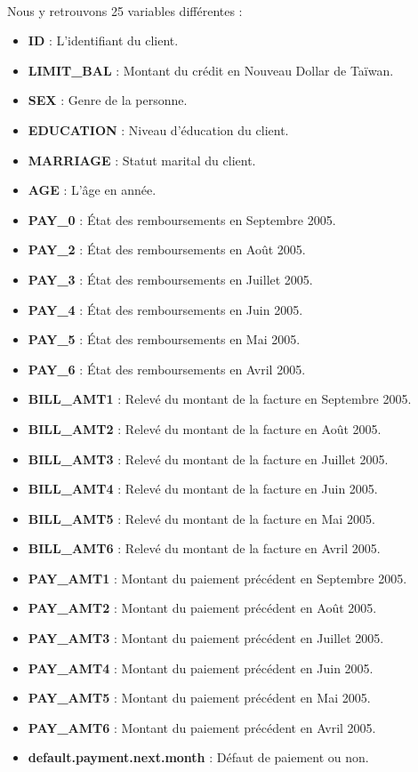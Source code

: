 \documentclass[10pt, french, a4paper]{report}
\begin{document}
\paragraph{}
Nous y retrouvons 25 variables différentes :

\begin{itemize}
  \item \textbf{ID} : L'identifiant du client. 
  \item \textbf{LIMIT\_BAL} : Montant du crédit en Nouveau Dollar de Taïwan.
  \item \textbf{SEX} : Genre de la personne.
  \item \textbf{EDUCATION} : Niveau d'éducation du client.
  \item \textbf{MARRIAGE} : Statut marital du client.
  \item \textbf{AGE} : L'âge en année.
  \item \textbf{PAY\_0} : État des remboursements en Septembre 2005.
  \item \textbf{PAY\_2} : État des remboursements en Août 2005.
  \item \textbf{PAY\_3} : État des remboursements en Juillet 2005.
  \item \textbf{PAY\_4} : État des remboursements en Juin 2005.
  \item \textbf{PAY\_5} : État des remboursements en Mai 2005.
  \item \textbf{PAY\_6} : État des remboursements en Avril 2005.
  \item \textbf{BILL\_AMT1} : Relevé du montant de la facture en Septembre 2005.
  \item \textbf{BILL\_AMT2} : Relevé du montant de la facture en Août 2005.
  \item \textbf{BILL\_AMT3} : Relevé du montant de la facture en Juillet 2005.
  \item \textbf{BILL\_AMT4} : Relevé du montant de la facture en Juin 2005.
  \item \textbf{BILL\_AMT5} : Relevé du montant de la facture en Mai 2005.
  \item \textbf{BILL\_AMT6} : Relevé du montant de la facture en Avril 2005.
  \item \textbf{PAY\_AMT1} : Montant du paiement précédent en Septembre 2005.
  \item \textbf{PAY\_AMT2} : Montant du paiement précédent en Août 2005.
  \item \textbf{PAY\_AMT3} : Montant du paiement précédent en Juillet 2005.
  \item \textbf{PAY\_AMT4} : Montant du paiement précédent en Juin 2005.
  \item \textbf{PAY\_AMT5} : Montant du paiement précédent en Mai 2005.
  \item \textbf{PAY\_AMT6} : Montant du paiement précédent en Avril 2005.
  \item \textbf{default.payment.next.month} : Défaut de paiement ou non.

\end{itemize}
\end{document}
